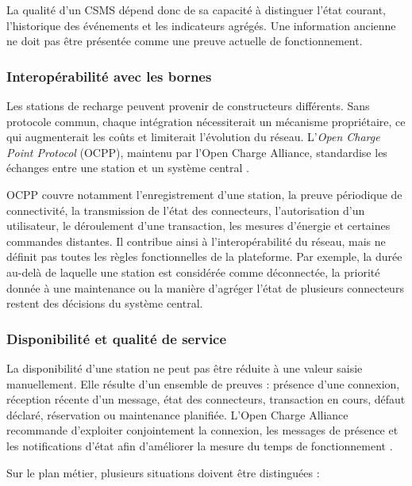 La qualité d'un CSMS dépend donc de sa capacité à distinguer l'état courant, l'historique
des événements et les indicateurs agrégés. Une information ancienne ne doit pas être
présentée comme une preuve actuelle de fonctionnement.

\subsubsection{Interopérabilité avec les bornes}

Les stations de recharge peuvent provenir de constructeurs différents. Sans protocole
commun, chaque intégration nécessiterait un mécanisme propriétaire, ce qui augmenterait
les coûts et limiterait l'évolution du réseau. L'\emph{Open Charge Point Protocol}
(OCPP), maintenu par l'Open Charge Alliance, standardise les échanges entre une station
et un système central \cite{ocaOcpp16,ov2xPlatform}.

OCPP couvre notamment l'enregistrement d'une station, la preuve périodique de
connectivité, la transmission de l'état des connecteurs, l'autorisation d'un utilisateur,
le déroulement d'une transaction, les mesures d'énergie et certaines commandes
distantes. Il contribue ainsi à l'interopérabilité du réseau, mais ne définit pas
toutes les règles fonctionnelles de la plateforme. Par exemple, la durée au-delà de
laquelle une station est considérée comme déconnectée, la priorité donnée à une
maintenance ou la manière d'agréger l'état de plusieurs connecteurs restent des
décisions du système central.

\subsubsection{Disponibilité et qualité de service}

La disponibilité d'une station ne peut pas être réduite à une valeur saisie manuellement.
Elle résulte d'un ensemble de preuves : présence d'une connexion, réception récente
d'un message, état des connecteurs, transaction en cours, défaut déclaré, réservation
ou maintenance planifiée. L'Open Charge Alliance recommande d'exploiter conjointement
la connexion, les messages de présence et les notifications d'état afin d'améliorer
la mesure du temps de fonctionnement \cite{ocaUptime2024}.

Sur le plan métier, plusieurs situations doivent être distinguées :

